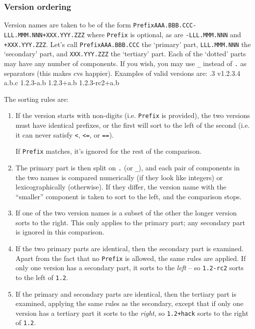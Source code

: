 \documentclass{article}
\newcommand{\code}[1]{\texttt{#1}}
\let\overbatim=\verbatim
\let\oendverbatim=\endverbatim
\renewenvironment{verbatim}
{\center\minipage{16cm}\overbatim}
{\oendverbatim\endminipage\endcenter}
\begin{document}
\subsubsection{Version ordering}
\label{versionOrdering}

Version names are taken to be of the form \code{PrefixAAA.BBB.CCC-LLL.MMM.NNN+XXX.YYY.ZZZ}
where \code{Prefix} is optional, as are \code{-LLL.MMM.NNN} and \code{+XXX.YYY.ZZZ}.  Let's call
\code{PrefixAAA.BBB.CCC} the `primary' part, \code{LLL.MMM.NNN} the `secondary' part, and \code{XXX.YYY.ZZZ}
the `tertiary' part.
Each of the `dotted' parts may have any number of components. If you wish, you may use \code{\_}
instead of \code{.} as separators (this makes cvs happier).  Examples of valid
versions are:
\begin{verbatim}
  1.2.3
  v1.2.3.4
  a.b.c
  1.2.3-a.b
  1.2.3+a.b
  1.2.3-rc2+a.b
\end{verbatim}

The sorting rules are:
\begin{enumerate}
  \item If the version starts with non-digits (i.e. \code{Prefix} is provided),
    the two versions must have identical prefixes, or the first will sort to the
    left of the second (i.e. it can never satisfy \code{<}, \code{<=}, or \code{==}).

    If \code{Prefix} matches, it's ignored for the rest of the comparison.

  \item The primary part is then split on \code{.} (or \code{\_}), and
    each pair of components in the two names is compared numerically (if they look like
    integers) or lexicographically (otherwise). If they differ, the version name
    with the ``smaller'' component is taken to sort to the left, and the comparison
    stops.

  \item If one of the two version names is a subset of the other
    the longer version sorts to the right.  This only applies to the
    primary part; any secondary part is ignored in this comparison.

  \item If the two primary parts are identical, then the secondary part is
    examined.  Apart from the fact that no \code{Prefix} is allowed, the same
    rules are applied.  If only one version has a secondary part, it sorts
    to the \emph{left} -- so \code{1.2-rc2} sorts to the left of \code{1.2}.

  \item If the primary and secondary parts are identical, then the tertiary part is
    examined, applying the same rules as the secondary, except that if only one
    version has a tertiary part it sorts to the \emph{right}, so \code{1.2+hack}
    sorts to the right of \code{1.2}.
\end{enumerate}
\end{document}
